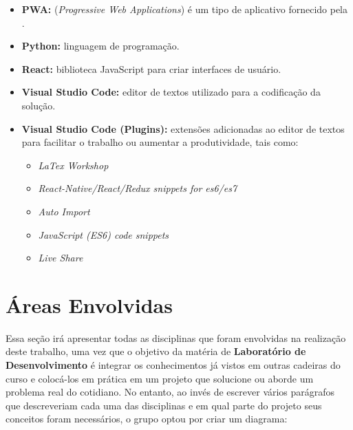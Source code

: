 \begin{itemize}
    \item \textbf{PWA:} (\textit{Progressive Web Applications}) é um tipo de \software{} aplicativo fornecido pela \web{}.
    \item \textbf{Python:} linguagem de programação.
    \item \textbf{React:} biblioteca JavaScript para criar interfaces de usuário.
    \item \textbf{Visual Studio Code:} editor de textos utilizado para a codificação da solução.
    \item \textbf{Visual Studio Code (Plugins):} extensões adicionadas ao editor de textos para facilitar o trabalho ou aumentar a produtividade, tais como:
    \begin{itemize}
        \item \textit{LaTex Workshop}
        \item \textit{React-Native/React/Redux snippets for es6/es7}
        \item \textit{Auto Import}
        \item \textit{JavaScript (ES6) code snippets}
        \item \textit{Live Share}
    \end{itemize}
\end{itemize}




\section{Áreas Envolvidas}
\label{sec:areas_envolvidas}

Essa seção irá apresentar todas as disciplinas que foram envolvidas na realização deste trabalho, uma vez que o objetivo da matéria de \textbf{Laboratório de Desenvolvimento} é integrar os conhecimentos já vistos em outras cadeiras do curso e colocá-los em prática em um projeto que solucione ou aborde um problema real do cotidiano. No entanto, ao invés de escrever vários parágrafos que descreveriam cada uma das disciplinas e em qual parte do projeto seus conceitos foram necessários, o grupo optou por criar um diagrama:

